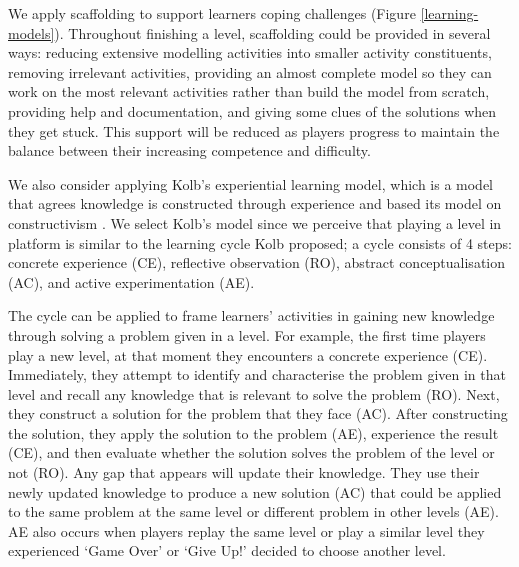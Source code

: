 \documentclass[12pt, a4paper]{report} \usepackage[titletoc]{appendix}
\begin{document}
\begin{appendices}
We apply scaffolding \cite{vygotsky1978mind, wood1976role} to support learners coping challenges (Figure \ref{learning-models}). Throughout finishing a level, scaffolding could be provided in several ways: reducing extensive modelling activities into smaller activity constituents, removing irrelevant activities, providing an almost complete model so they can work on the most relevant activities rather than build the model from scratch, providing help and documentation, and giving some clues of the solutions when they get stuck. This support will be reduced as players progress to maintain the balance between their increasing competence and difficulty.

We also consider applying Kolb's experiential learning model, which is a model that agrees knowledge is constructed through experience and based its model on constructivism \cite{kolb2014experiential}. We select Kolb's model since we perceive that playing a level in platform is similar to the learning cycle Kolb proposed; a cycle consists of 4 steps: concrete experience (CE), reflective observation (RO), abstract conceptualisation (AC), and active experimentation (AE). 

The cycle can be applied to frame learners' activities in gaining new knowledge through solving a problem given in a level. For example, the first time players play a new level, at that moment they encounters a concrete experience (CE). Immediately, they attempt to identify and characterise the problem given in that level and recall any knowledge that is relevant to solve the problem (RO). Next, they construct a solution for the problem that they face (AC). After constructing the solution, they apply the solution to the problem (AE), experience the result (CE), and then evaluate whether the solution solves the problem of the level or not (RO). Any gap that appears will update their knowledge. They use their newly updated knowledge to produce a new solution (AC) that could be applied to the same problem at the same level or different problem in other levels (AE). AE also occurs when players replay the same level or play a similar level they experienced `Game Over' or `Give Up!' decided to choose another level.


\end{appendices}
\end{document}
